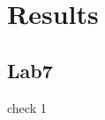 \chapter{Results}

\section{Lab7}

\begin{listing}
\caption{check 1}
\inputminted[firstline=10,lastline=15]{systemverilog}{../lab7/v0/ex2-1-property.sv}
\end{listing}